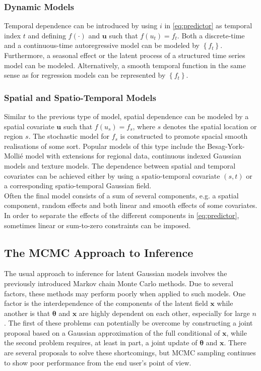 \documentclass[12pt]{book}
\begin{document}
\subsubsection*{Dynamic Models}
Temporal dependence can be introduced by using $i$ in \eqref{eq:predictor} as temporal index $t$ and defining $f\left(\cdot\right)$ and $\pmb{u}$ such that $f\left(u_t\right)=f_t$. Both a discrete-time and a continuous-time autoregressive model can be modeled by $\left\lbrace f_t\right\rbrace$. Furthermore, a seasonal effect or the latent process of a structured time series model can be modeled. Alternatively, a smooth temporal function in the same sense as for regression models can be represented by $\left\lbrace f_t\right\rbrace$.
\subsubsection*{Spatial and Spatio-Temporal Models}
Similar to the previous type of model, spatial dependence can be modeled by a spatial covariate $\pmb{u}$ such that $f\left(u_s\right)=f_s$, where $s$ denotes the spatial location or region $s$. The stochastic model for $f_s$ is constructed to promote spacial smooth realisations of some sort. Popular models of this type include the Besag-York-Mollié model with extensions for regional data, continuous indexed Gaussian models and texture models. The dependence between spatial and temporal covariates can be achieved either by using a spatio-temporal covariate $(s,t)$ or a corresponding spatio-temporal Gaussian field.\\
Often the final model consists of a sum of several components, e.g. a spatial component, random effects and both linear and smooth effects of some covariates. In order to separate the effects of the different components in \eqref{eq:predictor}, sometimes linear or sum-to-zero constraints can be imposed\autocite[Cf.][]{rue2009approximate}.
\subsection{The MCMC Approach to Inference}
The usual approach to inference for latent Gaussian models involves the previously introduced Markov chain Monte Carlo methods. Due to several factors, these methods may perform poorly when applied to such models. One factor is the interdependence of the components of the latent field $\pmb{x}$ while another is that $\pmb{\theta}$ and $\pmb{x}$ are highly dependent on each other, especially for large $n$. The first of these problems can potentially be overcome by constructing a joint proposal based on a Gaussian approximation of the full conditional of $\pmb{x}$, while the second problem requires, at least in part, a joint update of $\pmb{\theta}$ and $\pmb{x}$. There are several proposals to solve these shortcomings, but MCMC sampling continues to show poor performance from the end user's point of view\autocite[Cf.][]{rue2009approximate}.
\end{document}
